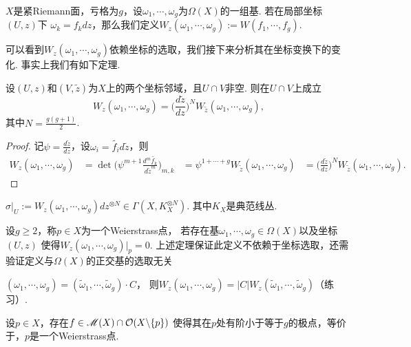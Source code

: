 \begin{definition}
	$X$是紧Riemann面，亏格为$g$，设$\omega_1,\cdots,\omega_g$为$\Omega(X)$的一组基. 
    若在局部坐标 $(U,z)$下 $\omega_k=f_kdz$，那么我们定义$W_z(\omega_1,\cdots,\omega_g):=W(f_1,\cdots,f_g)$. 
\end{definition}

可以看到$W_z(\omega_1,\cdots,\omega_g)$依赖坐标的选取，我们接下来分析其在坐标变换下的变化.
事实上我们有如下定理.
\begin{theorem}
	设$(U,z)$和$(V,\tilde{z})$为$X$上的两个坐标邻域，且$U\cap V$非空. 则在$U\cap V$上成立
	$$W_z(\omega_1,\cdots,\omega_g)
    =\bigg(\frac{d\tilde{z}}{dz}\bigg)^N W_{\tilde{z}}(\omega_1,\cdots,\omega_g),$$
	其中$N=\frac{g(g+1)}{2}$.
\end{theorem}
\begin{proof}
    记$\psi=\frac{d\tilde{z}}{dz}$，设$\omega_i=\tilde{f_i}d\tilde{z}$，则
    \begin{align*}
        W_z(\omega_1,\cdots,\omega_g)&=\det \bigg(\psi^{m+1}\frac{d^m\tilde{f_k}}{d\tilde{z}^m}\bigg)_{m,k}
        &=\psi^{1+\cdots+g}W_{\tilde{z}}(\omega_1,\cdots,\omega_g)
        &=\bigg(\frac{d\tilde{z}}{dz}\bigg)^N W_{\tilde{z}}(\omega_1,\cdots,\omega_g).
    \end{align*}
\end{proof}
\begin{remark}
	$\sigma|_U:=W_z(\omega_1,\cdots,\omega_g)dz^{\otimes N}\in \Gamma(X,K_X^{\otimes N})$. 其中$K_X$是典范线丛.
\end{remark}

\begin{definition}
	设$g\geq 2$，称$p\in X$为一个Weierstrass点，
    若存在基$\omega_1,\cdots,\omega_g\in \Omega(X)$以及坐标$(U,z)$
    使得$W_z(\omega_1,\cdots,\omega_g)|_p=0$. 
    上述定理保证此定义不依赖于坐标选取，还需验证定义与$\Omega(X)$的正交基的选取无关

	$(\omega_1,\cdots,\omega_g)=(\tilde{\omega}_1,\cdots,\tilde{\omega}_g)\cdot C$，
    则$W_z(\omega_1,\cdots,\omega_g)=|C| W_z(\tilde{\omega}_1,\cdots,\tilde{\omega}_g)$（练习）.
\end{definition}

\begin{theorem}
	设$p\in X$，存在$f\in \mathscr{M}(X) \cap \mathcal{O}(X\backslash \{p\})$
    使得其在$p$处有阶小于等于$g$的极点，等价于，$p$是一个Weierstrass点.
\end{theorem}

